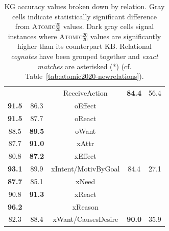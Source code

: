 \documentclass[10pt,aspectratio=43]{beamer}
\newcommand\atomicTT{\textsc{Atomic$^{20}_{20}$}\xspace}
\begin{document}
\begin{frame}
\begin{table}[t]
{\begin{tabular}{ccccc}
                 &  & ReceiveAction & \textbf{84.4} & 56.4 \\
                \textbf{91.5} & 86.3 & oEffect &  &  \\
                \textbf{91.5} & 87.7 & oReact &  &  \\
                88.5 & \textbf{89.5} & oWant &  &  \\
                87.7 & \textbf{91.0} & xAttr &  &  \\
                80.8 & \textbf{87.2} & xEffect &  &  \\
                \textbf{93.1} & 89.9 & xIntent/MotivByGoal & 84.4 & \cellcolor{gray!25} 27.1 \\
                \textbf{87.7} & 85.1 & xNeed &  &  \\
                90.8 & \textbf{91.3} & xReact &  &  \\
                \textbf{96.2} &  & xReason &  &  \\
                82.3 & 88.4 & xWant/CausesDesire & \textbf{90.0} & \cellcolor{gray!25} 35.9 \\
                
                \bottomrule
             \end{tabular}}
            \caption{KG accuracy values broken down by relation. Gray cells indicate statistically significant difference from \atomicTT{} values. Dark gray cells signal instances where \atomicTT{} values are significantly higher than its counterpart KB. Relational \textit{cognates} have been grouped together and \textit{exact matches} are asterisked (*) (cf. Table~\ref{tab:atomic2020-newrelations}).}
            \label{tab:precision:breakdown}
        \end{table}
    \end{frame}
\end{document}
